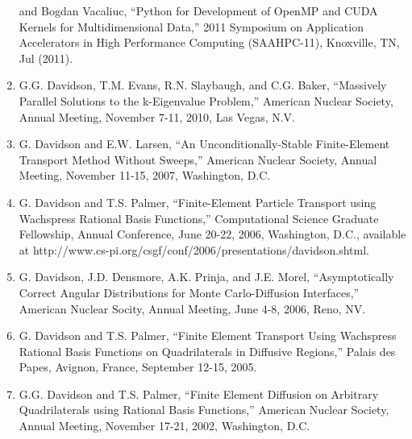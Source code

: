 \documentclass[letterpaper,11pt]{article}
\begin{document}
\begin{enumerate}
    and Bogdan Vacaliuc, ``Python for Development of OpenMP and CUDA
    Kernels for Multidimensional Data,'' 2011 Symposium on
    Application Accelerators in High Performance Computing
    (SAAHPC-11), Knoxville, TN, Jul (2011).
  \item G.G. Davidson, T.M. Evans, R.N. Slaybaugh, and C.G. Baker,
    ``Massively Parallel Solutions to the k-Eigenvalue Problem,''
    American Nuclear Society, Annual Meeting, November 7-11, 2010, Las
    Vegas, N.V.
  \item G. Davidson and E.W. Larsen, ``An Unconditionally-Stable
    Finite-Element Transport Method Without Sweeps,'' American Nuclear
    Society, Annual Meeting, November 11-15, 2007, Washington, D.C.
  \item G. Davidson and T.S. Palmer, ``Finite-Element Particle
    Transport using Wachspress Rational Basis Functions,''
    Computational Science Graduate Fellowship, Annual Conference, June
    20-22, 2006, Washington, D.C., available at
    http://www.cs-pi.org/csgf/conf/2006/presentations/davidson.shtml.
  \item G. Davidson, J.D. Densmore, A.K. Prinja, and J.E. Morel,
    ``Asymptotically Correct Angular Distributions for Monte
    Carlo-Diffusion Interfaces,'' American Nuclear Socity, Annual
    Meeting, June 4-8, 2006, Reno, NV.
  \item G. Davidson and T.S. Palmer, ``Finite Element Transport Using
    Wachspress Rational Basis Functions on Quadrilaterals in Diffusive
    Regions,'' Palais des Papes, Avignon, France, September 12-15,
    2005.
  \item G.G. Davidson and T.S. Palmer, ``Finite Element Diffusion on
    Arbitrary Quadrilaterals using Rational Basis Functions,'' American
    Nuclear Society, Annual Meeting, November 17-21, 2002, Washington,
    D.C.
\end{enumerate}

\end{document}
